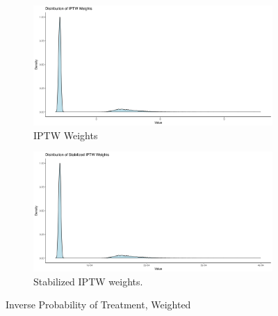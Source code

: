 \documentclass[english, 12pt]{article}
\begin{document}
\begin{figure}
\centering
\begin{subfigure}{\columnwidth}
\centering
    \includegraphics[scale=0.5]{figures/IPTW_weights.png}
    \caption{IPTW Weights}
    \label{fig:IPTW_a}
\end{subfigure}\hspace{0.1in}
\begin{subfigure}{\columnwidth}
\centering
    \includegraphics[scale=0.5]{figures/stabilized_IPTW_weights.png}
    \caption{Stabilized IPTW weights.}
    \label{fig:IPTW_b}
\end{subfigure}
\caption{Inverse Probability of Treatment, Weighted}
\label{fig:IPTW}
\end{figure}
\end{document}
